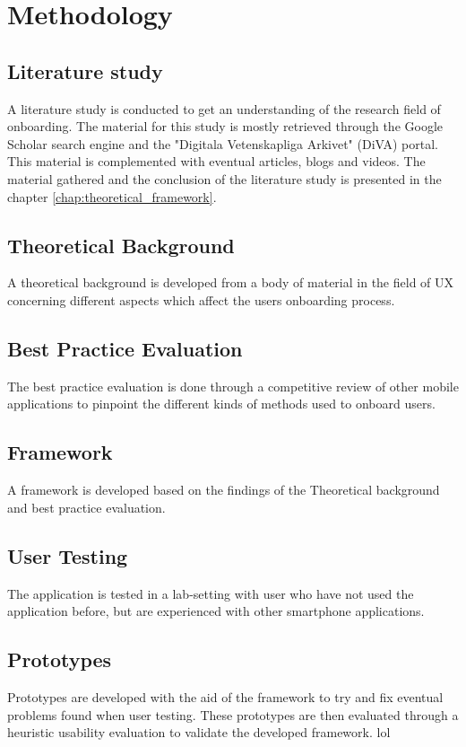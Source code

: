 \chapter{Methodology}
\label{chap:methodology}

\section{Literature study}
A literature study is conducted to get an understanding of the research field of onboarding. The material for this study is mostly retrieved through the Google Scholar search engine and the "Digitala Vetenskapliga Arkivet" (DiVA) portal. This material is complemented with eventual articles, blogs and videos. The material gathered and the conclusion of the literature study is presented in the chapter \ref{chap:theoretical_framework}.

\section{Theoretical Background}
A theoretical background is developed from a body of material in the field of UX concerning different aspects which affect the users onboarding process.

\section{Best Practice Evaluation}
%
The best practice evaluation is done through a competitive review \cite{Schade2013} of other mobile applications to pinpoint the different kinds of methods used to onboard users.

\section{Framework}
A framework is developed based on the findings of the Theoretical background and best practice evaluation.

\section{User Testing}
The application is tested in a lab-setting with user who have not used the application before, but are experienced with other smartphone applications. 

\section{Prototypes}
%
Prototypes are developed with the aid of the framework to try and fix eventual problems found when user testing. These prototypes are then evaluated through a heuristic usability evaluation to validate the developed framework.
lol
